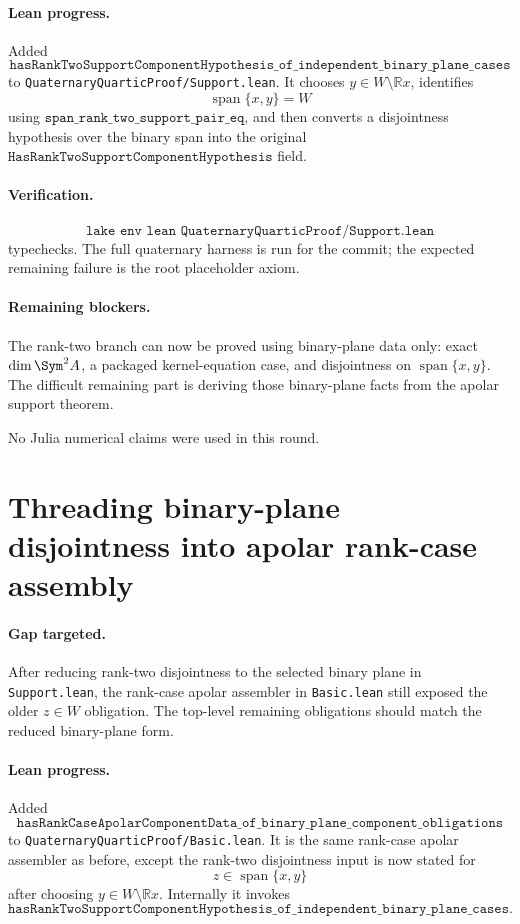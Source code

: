 \documentclass[11pt]{article}
\begin{document}
\paragraph{Lean progress.}
Added
\[
\texttt{hasRankTwoSupportComponentHypothesis\_of\_independent\_binary\_plane\_cases}
\]
to \texttt{QuaternaryQuarticProof/Support.lean}.  It chooses
\(y\in W\setminus\mathbb{R}x\), identifies
\[
\operatorname{span}\{x,y\}=W
\]
using \(\texttt{span\_rank\_two\_support\_pair\_eq}\), and then converts a
disjointness hypothesis over the binary span into the original
\(\texttt{HasRankTwoSupportComponentHypothesis}\) field.

\paragraph{Verification.}
\[
\texttt{lake env lean QuaternaryQuarticProof/Support.lean}
\]
typechecks.  The full quaternary harness is run for the commit; the expected
remaining failure is the root placeholder axiom.

\paragraph{Remaining blockers.}
The rank-two branch can now be proved using binary-plane data only: exact
\(\dim\Sym^2A\), a packaged kernel-equation case, and disjointness on
\(\operatorname{span}\{x,y\}\).  The difficult remaining part is deriving
those binary-plane facts from the apolar support theorem.

No Julia numerical claims were used in this round.

\section*{Threading binary-plane disjointness into apolar rank-case assembly}

\paragraph{Gap targeted.}
After reducing rank-two disjointness to the selected binary plane in
\texttt{Support.lean}, the rank-case apolar assembler in \texttt{Basic.lean}
still exposed the older \(z\in W\) obligation.  The top-level remaining
obligations should match the reduced binary-plane form.

\paragraph{Lean progress.}
Added
\[
\texttt{hasRankCaseApolarComponentData\_of\_binary\_plane\_component\_obligations}
\]
to \texttt{QuaternaryQuarticProof/Basic.lean}.  It is the same rank-case
apolar assembler as before, except the rank-two disjointness input is now
stated for
\[
z\in\operatorname{span}\{x,y\}
\]
after choosing \(y\in W\setminus\mathbb{R}x\).  Internally it invokes
\[
\texttt{hasRankTwoSupportComponentHypothesis\_of\_independent\_binary\_plane\_cases}.
\]
\end{document}
